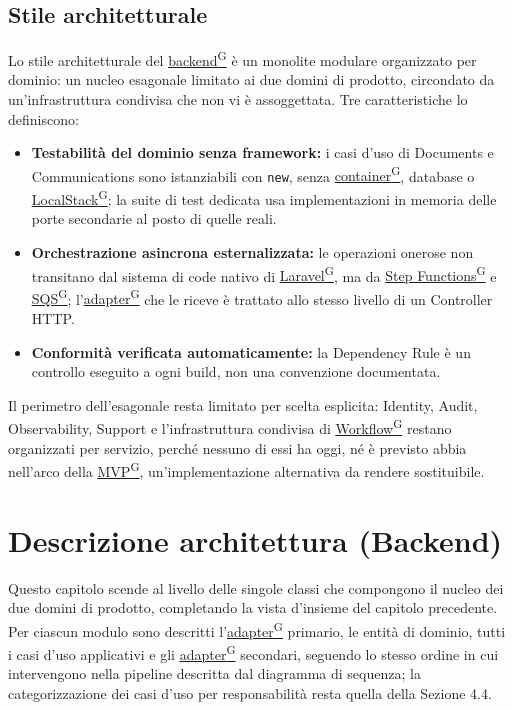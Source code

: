 \documentclass[a4paper,12pt]{article}
\providecommand{\glslink}[2]{\href{https://alittlebyte-19.github.io/Documentazione/glossario.html\#gls-#1}{\underline{#2}\textsuperscript{\scriptsize G}}}
\begin{document}
\subsection{Stile architetturale}

Lo stile architetturale del \glslink{backend}{backend} è un monolite modulare organizzato per dominio: un nucleo esagonale limitato ai due domini di prodotto, circondato da un'infrastruttura condivisa che non vi è assoggettata. Tre caratteristiche lo definiscono:

\begin{itemize}
    \item \textbf{Testabilità del dominio senza framework:} i casi d'uso di Documents e Communications sono istanziabili con \texttt{new}, senza \glslink{container}{container}, database o \glslink{localstack}{LocalStack}; la suite di test dedicata usa implementazioni in memoria delle porte secondarie al posto di quelle reali.
    \item \textbf{Orchestrazione asincrona esternalizzata:} le operazioni onerose non transitano dal sistema di code nativo di \glslink{laravel}{Laravel}, ma da \glslink{step-functions}{Step Functions} e \glslink{sqs-simple-queue-service}{SQS}; l'\glslink{adapter}{adapter} che le riceve è trattato allo stesso livello di un Controller HTTP.
    \item \textbf{Conformità verificata automaticamente:} la Dependency Rule è un controllo eseguito a ogni build, non una convenzione documentata.
\end{itemize}

Il perimetro dell'esagonale resta limitato per scelta esplicita: Identity, Audit, Observability, Support e l'infrastruttura condivisa di \glslink{workflow}{Workflow} restano organizzati per servizio, perché nessuno di essi ha oggi, né è previsto abbia nell'arco della \glslink{mvp-minimum-viable-product}{MVP}, un'implementazione alternativa da rendere sostituibile.

\section{Descrizione architettura (Backend)}

Questo capitolo scende al livello delle singole classi che compongono il nucleo dei due domini di prodotto, completando la vista d'insieme del capitolo precedente. Per ciascun modulo sono descritti l'\glslink{adapter}{adapter} primario, le entità di dominio, tutti i casi d'uso applicativi e gli \glslink{adapter}{adapter} secondari, seguendo lo stesso ordine in cui intervengono nella pipeline descritta dal diagramma di sequenza; la categorizzazione dei casi d'uso per responsabilità resta quella della Sezione 4.4.
\end{document}
